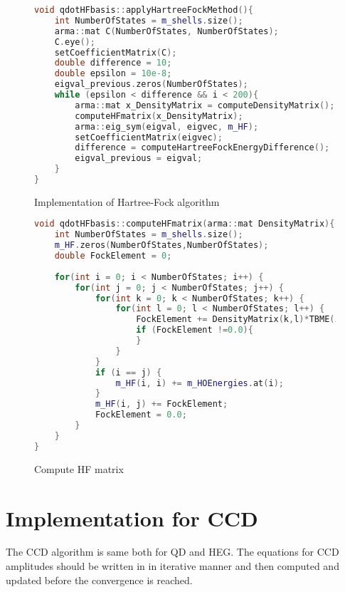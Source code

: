 \begin{figure}
	\begin{lstlisting}[language=C++]
void qdotHFbasis::applyHartreeFockMethod(){
	int NumberOfStates = m_shells.size();
	arma::mat C(NumberOfStates, NumberOfStates);
	C.eye();
	setCoefficientMatrix(C);
	double difference = 10; 
	double epsilon = 10e-8;
	eigval_previous.zeros(NumberOfStates);
	while (epsilon < difference && i < 200){
		arma::mat x_DensityMatrix = computeDensityMatrix();
		computeHFmatrix(x_DensityMatrix);
		arma::eig_sym(eigval, eigvec, m_HF);
		setCoefficientMatrix(eigvec);
		difference = computeHartreeFockEnergyDifference();
		eigval_previous = eigval;
	}
}
\end{lstlisting}
\caption{Implementation of Hartree-Fock algorithm} \label{f:applyHF}
\end{figure}



\begin{figure}
\begin{lstlisting}[language=C++]
void qdotHFbasis::computeHFmatrix(arma::mat DensityMatrix){
	int NumberOfStates = m_shells.size();
	m_HF.zeros(NumberOfStates,NumberOfStates);
	double FockElement = 0;
	
	for(int i = 0; i < NumberOfStates; i++) {
		for(int j = 0; j < NumberOfStates; j++) {
			for(int k = 0; k < NumberOfStates; k++) {
				for(int l = 0; l < NumberOfStates; l++) {
					FockElement += DensityMatrix(k,l)*TBME(i,k,j,l);
					if (FockElement !=0.0){
					}
				}
			}
			if (i == j) {
				m_HF(i, i) += m_HOEnergies.at(i);
			}
			m_HF(i, j) += FockElement;
			FockElement = 0.0;
		}
	}
}
\end{lstlisting}
\caption{Compute HF matrix}
\end{figure}
\section{Implementation for CCD}\label{sec:CCDimpl}
The CCD algorithm is same both for QD and HEG. The equations for CCD amplitudes should be written in in iterative manner and then computed and updated before the convergence is reached.\\

